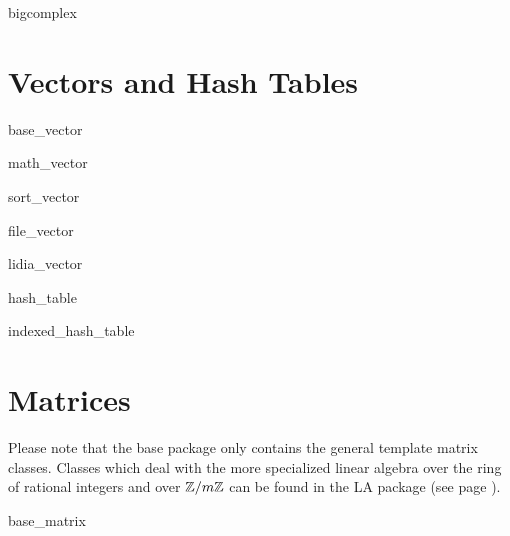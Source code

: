 %  

\begin{class}{bigcomplex}
  
\end{class}


\chapter{Vectors and Hash Tables}

\begin{class}{base_vector}
  
\end{class}

\begin{class}{math_vector}
  
\end{class}

\begin{class}{sort_vector}
  
\end{class}

\begin{class}{file_vector}
  
\end{class}

\begin{class}{lidia_vector}
  
\end{class}

\begin{class}{hash_table}
  
\end{class}

\begin{class}{indexed_hash_table}
  
\end{class}


\chapter{Matrices} \label{LiDIA-base:matrices}

Please note that the \LiDIA base package only contains the general template matrix classes.
Classes which deal with the more specialized linear algebra over the ring of rational integers
and over $\mathbb{Z}/m\mathbb{Z}$ can be found in the \LiDIA LA package (see page \pageref{LiDIA-LA}).

\begin{class}{base_matrix}
  
\end{class}

